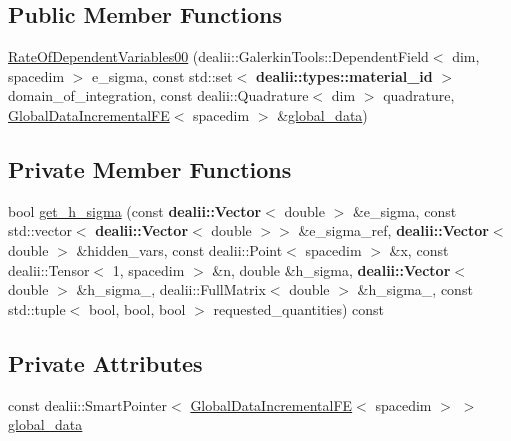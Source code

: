 \subsection*{Public Member Functions}
\begin{DoxyCompactItemize}
\item 
\hyperlink{classincremental_f_e_1_1_rate_of_dependent_variables00_a6152bfa1aed705a8ea400ac2fb9bc690}{Rate\+Of\+Dependent\+Variables00} (dealii\+::\+Galerkin\+Tools\+::\+Dependent\+Field$<$ dim, spacedim $>$ e\+\_\+sigma, const std\+::set$<$ {\bf dealii\+::types\+::material\+\_\+id} $>$ domain\+\_\+of\+\_\+integration, const dealii\+::\+Quadrature$<$ dim $>$ quadrature, \hyperlink{classincremental_f_e_1_1_global_data_incremental_f_e}{Global\+Data\+Incremental\+FE}$<$ spacedim $>$ \&\hyperlink{classincremental_f_e_1_1_rate_of_dependent_variables00_a0ae0d07da073985a32f9fc812d13a066}{global\+\_\+data})
\end{DoxyCompactItemize}
\subsection*{Private Member Functions}
\begin{DoxyCompactItemize}
\item 
bool \hyperlink{classincremental_f_e_1_1_rate_of_dependent_variables00_ae55e12bfa1bee991b8eb61d1cbf7b907}{get\+\_\+h\+\_\+sigma} (const {\bf dealii\+::\+Vector}$<$ double $>$ \&e\+\_\+sigma, const std\+::vector$<$ {\bf dealii\+::\+Vector}$<$ double $>$$>$ \&e\+\_\+sigma\+\_\+ref, {\bf dealii\+::\+Vector}$<$ double $>$ \&hidden\+\_\+vars, const dealii\+::\+Point$<$ spacedim $>$ \&x, const dealii\+::\+Tensor$<$ 1, spacedim $>$ \&n, double \&h\+\_\+sigma, {\bf dealii\+::\+Vector}$<$ double $>$ \&h\+\_\+sigma\+\_, dealii\+::\+Full\+Matrix$<$ double $>$ \&h\+\_\+sigma\+\_, const std\+::tuple$<$ bool, bool, bool $>$ requested\+\_\+quantities) const 
\end{DoxyCompactItemize}
\subsection*{Private Attributes}
\begin{DoxyCompactItemize}
\item 
const dealii\+::\+Smart\+Pointer$<$ \hyperlink{classincremental_f_e_1_1_global_data_incremental_f_e}{Global\+Data\+Incremental\+FE}$<$ spacedim $>$ $>$ \hyperlink{classincremental_f_e_1_1_rate_of_dependent_variables00_a0ae0d07da073985a32f9fc812d13a066}{global\+\_\+data}
\end{DoxyCompactItemize}


